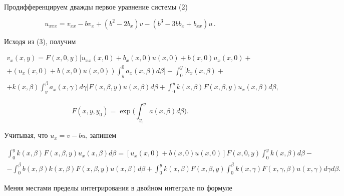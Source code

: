 Продифференцируем дважды первое уравнение системы (2)


\begin{equation}


u_{xxx}=v_{xx}-bv_{x}+(b^{2}-2b_{x})v-(b^{3}-3bb_{x}+b_{xx})u\, .


\end{equation}


Исходя из (3), получим


\begin{multline*}


v_{x}(x,y)=F(x,0,y)\bigg[ u_{xx}(x,0)+b_{x}(x,0)u(x,0)


+b(x,0)u_{x}(x,0)+\\


+(u_{x}(x,0)+b(x,0)u(x,0))


\int_{y}^{0} a_{x}(x,\beta) d\beta\bigg]+\int_{0}^{y}


\bigg[ k_{x}(x,\beta)+\\


+k(x,\beta)\int_{y}^{\beta} a_{x}(x,\gamma)d\gamma


\bigg] F(x,\beta,y)u(x,\beta)d\beta+


\int_{0}^{y} k(x,\beta)F(x,\beta,y)u_{x}(x,\beta)d\beta,


\end{multline*}


$$


F(x,y,y_{0})=\exp\bigg(\int_{y_{0}}^{y}


a(x,\beta)d\beta\bigg).


$$


Учитывая, что $u_{x}=v-bu$, запишем


\begin{multline*}


\int_{0}^{y} k(x,\beta)F(x,\beta,y)u_{x}(x,\beta)d\beta=


[u_{x}(x,0)+b(x,0)u(x,0)]


F(x,0,y)\int_{0}^{y} k(x,\beta)d\beta- \\


%


-\int_{0}^{\beta} b(x,\beta)k(x,\beta)F(x,\beta,y)u(x,\beta)d\beta+


\int_{0}^{y} k(x,\beta)F(x,\beta,y)\int_{0}^{\beta}


k(x,\gamma)F(x,\gamma,\beta)u(x,\gamma)d\gamma d\beta.


\end{multline*}


Меняя местами пределы интегрирования в двойном интеграле по формуле


